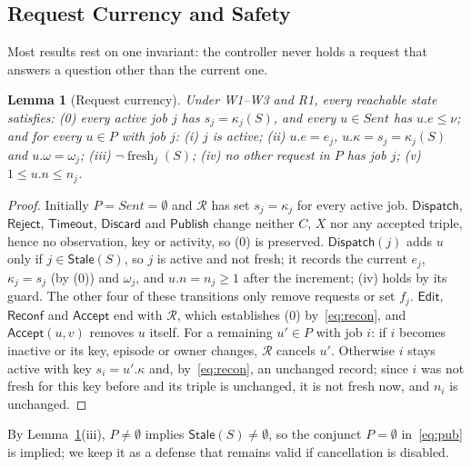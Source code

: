 \documentclass[pdflatex,sn-mathphys-num]{sn-jnl}
\theoremstyle{thmstyleone}%
\newtheorem{lemma}[theorem]{Lemma}%
\theoremstyle{thmstyletwo}%
\theoremstyle{thmstylethree}%
\newcommand{\key}{\kappa}
\newcommand{\fresh}{\operatorname{fresh}}
\newcommand{\Stale}{\mathsf{Stale}}
\newcommand{\Sent}{\mathit{Sent}}
\newcommand{\Acc}{\mathsf{Accept}}
\newcommand{\Disp}{\mathsf{Dispatch}}
\begin{document}
\subsection{Request Currency and Safety}
Most results rest on one invariant: the controller never holds a request that answers a question other than the current one.

\begin{lemma}[Request currency]\label{lem:currency}
Under W1--W3 and R1, every reachable state satisfies: (0) every active job $j$ has $s_j=\key_j(S)$, and every $u\in\Sent$ has $u.e\le\nu$; and for every $u\in P$ with job $j$: (i) $j$ is active; (ii) $u.e=e_j$, $u.\key=s_j=\key_j(S)$ and $u.\omega=\omega_j$; (iii) $\neg\fresh_j(S)$; (iv) no other request in $P$ has job $j$; (v) $1\le u.n\le n_j$.
\end{lemma}
\begin{proof}
Initially $P=\Sent=\emptyset$ and $\mathcal R$ has set $s_j=\key_j$ for every active job. $\Disp$, $\mathsf{Reject}$, $\mathsf{Timeout}$, $\mathsf{Discard}$ and $\mathsf{Publish}$ change neither $C$, $X$ nor any accepted triple, hence no observation, key or activity, so (0) is preserved. $\Disp(j)$ adds $u$ only if $j\in\Stale(S)$, so $j$ is active and not fresh; it records the current $e_j$, $\key_j=s_j$ (by (0)) and $\omega_j$, and $u.n=n_j\ge1$ after the increment; (iv) holds by its guard. The other four of these transitions only remove requests or set $f_j$. $\mathsf{Edit}$, $\mathsf{Reconf}$ and $\Acc$ end with $\mathcal R$, which establishes (0) by~\eqref{eq:recon}, and $\Acc(u,v)$ removes $u$ itself. For a remaining $u'\in P$ with job $i$: if $i$ becomes inactive or its key, episode or owner changes, $\mathcal R$ cancels $u'$. Otherwise $i$ stays active with key $s_i=u'.\key$ and, by~\eqref{eq:recon}, an unchanged record; since $i$ was not fresh for this key before and its triple is unchanged, it is not fresh now, and $n_i$ is unchanged.
\end{proof}

By Lemma~\ref{lem:currency}(iii), $P\ne\emptyset$ implies $\Stale(S)\ne\emptyset$, so the conjunct $P=\emptyset$ in~\eqref{eq:pub} is implied; we keep it as a defense that remains valid if cancellation is disabled.
\end{document}
